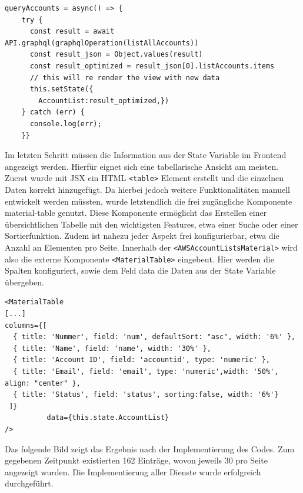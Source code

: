 \begin{lstlisting}[basicstyle=\ttfamily\small, breaklines=true , frame = single, backgroundcolor=\color{flashwhite},caption={Abruf der Daten und Speicherung in State Variable (Datei: \textit{\nameref{lst:React AccountList}} )} ]
queryAccounts = async() => {
    try {
      const result = await API.graphql(graphqlOperation(listAllAccounts))
      const result_json = Object.values(result)
      const result_optimized = result_json[0].listAccounts.items
      // this will re render the view with new data
      this.setState({
        AccountList:result_optimized,})
    } catch (err) {
      console.log(err);
    }}
\end{lstlisting}


Im letzten Schritt müssen die Information aus der State Variable im Frontend angezeigt werden.
Hierfür eignet sich eine tabellarische Ansicht am meisten.
Zuerst wurde mit JSX ein HTML \verb+<table>+ Element erstellt und die einzelnen Daten korrekt hinzugefügt.
Da hierbei jedoch weitere Funktionalitäten manuell entwickelt werden müssten, wurde letztendlich die frei zugängliche Komponente \glqq material-table\grqq{} genutzt.
Diese Komponente ermöglicht das Erstellen einer übersichtlichen Tabelle mit den wichtigsten Features, etwa einer Suche oder einer Sortierfunktion.
Zudem ist nahezu jeder Aspekt frei konfigurierbar, etwa die Anzahl an Elementen pro Seite.\cite[]{MaterialTable}
Innerhalb der \verb+<AWSAccountListsMaterial>+ wird also die externe Komponente \verb+<MaterialTable>+ eingebeut.
Hier werden die Spalten konfiguriert, sowie dem Feld \glqq data\grqq{} die Daten aus der State Variable übergeben.

\begin{lstlisting}[basicstyle=\ttfamily\small, breaklines=true , frame = single, backgroundcolor=\color{flashwhite} ]
<MaterialTable
[...]
columns={[
  { title: 'Nummer', field: 'num', defaultSort: "asc", width: '6%' },
  { title: 'Name', field: 'name', width: '30%' },
  { title: 'Account ID', field: 'accountid', type: 'numeric' },
  { title: 'Email', field: 'email', type: 'numeric',width: '50%', align: "center" },
  { title: 'Status', field: 'status', sorting:false, width: '6%'}
 ]}
          data={this.state.AccountList}
/>
    \end{lstlisting}


 Das folgende Bild zeigt das Ergebnis nach der Implementierung des Codes.
 Zum gegebenen Zeitpunkt existierten 162 Einträge, wovon jeweils 30 pro Seite angezeigt wurden.
 Die Implementierung aller Dienste wurde erfolgreich durchgeführt.

